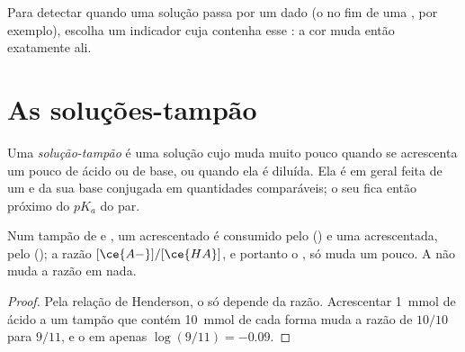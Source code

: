 \begin{method}\label{met:g12:buffers-predominance:indicator}
Para detectar quando uma solução passa por um dado  (o  no fim de
uma , por exemplo), escolha um indicador cuja 
contenha esse : a cor muda então exatamente ali.
\end{method}

\section{As soluções-tampão}

\begin{definition}\label{def:g12:buffers-predominance:buffer}
Uma \emph{solução-tampão} é uma solução cujo 
muda muito pouco quando se acrescenta um pouco de ácido ou de base, ou
quando ela é diluída. Ela é em geral feita de um  e da sua
base conjugada em quantidades comparáveis; o seu  fica então próximo
do $pK_a$ do par.
\end{definition}

\begin{proposition}\label{prop:g12:buffers-predominance:buffer}
Num tampão de  e , um  acrescentado é consumido
pelo  () e uma  acrescentada,
pelo  (); a razão $[\ce{A-}]/[\ce{HA}]$,
e portanto o , só muda um pouco. A  não muda a razão em nada.
\end{proposition}

\begin{proof}
Pela relação de Henderson, o  só depende da razão. Acrescentar
\qty{1}{mmol} de ácido a um tampão que contém \qty{10}{mmol} de cada
forma muda a razão de $10/10$ para $9/11$, e o  em apenas
$\log(9/11) = -0.09$.
\end{proof}

